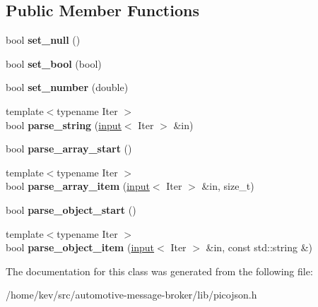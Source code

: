 \subsection*{Public Member Functions}
\begin{DoxyCompactItemize}
\item 
\hypertarget{classpicojson_1_1null__parse__context_ad142ddadd513e41324f8d0515a19df2c}{bool {\bfseries set\+\_\+null} ()}\label{classpicojson_1_1null__parse__context_ad142ddadd513e41324f8d0515a19df2c}

\item 
\hypertarget{classpicojson_1_1null__parse__context_aa77397f08cf7859fabc04e9e4460b93a}{bool {\bfseries set\+\_\+bool} (bool)}\label{classpicojson_1_1null__parse__context_aa77397f08cf7859fabc04e9e4460b93a}

\item 
\hypertarget{classpicojson_1_1null__parse__context_aeb8326108d42615b1b04cf82d510040c}{bool {\bfseries set\+\_\+number} (double)}\label{classpicojson_1_1null__parse__context_aeb8326108d42615b1b04cf82d510040c}

\item 
\hypertarget{classpicojson_1_1null__parse__context_aab2c7dee1eb5b477370832811cd40d14}{{\footnotesize template$<$typename Iter $>$ }\\bool {\bfseries parse\+\_\+string} (\hyperlink{classpicojson_1_1input}{input}$<$ Iter $>$ \&in)}\label{classpicojson_1_1null__parse__context_aab2c7dee1eb5b477370832811cd40d14}

\item 
\hypertarget{classpicojson_1_1null__parse__context_ae78f8991e157a85b7ce0fb36f9a5f628}{bool {\bfseries parse\+\_\+array\+\_\+start} ()}\label{classpicojson_1_1null__parse__context_ae78f8991e157a85b7ce0fb36f9a5f628}

\item 
\hypertarget{classpicojson_1_1null__parse__context_a6623f92117dd6dc7bca60e9e9463a1a0}{{\footnotesize template$<$typename Iter $>$ }\\bool {\bfseries parse\+\_\+array\+\_\+item} (\hyperlink{classpicojson_1_1input}{input}$<$ Iter $>$ \&in, size\+\_\+t)}\label{classpicojson_1_1null__parse__context_a6623f92117dd6dc7bca60e9e9463a1a0}

\item 
\hypertarget{classpicojson_1_1null__parse__context_a95c208456592c33d53548fa88b831c7c}{bool {\bfseries parse\+\_\+object\+\_\+start} ()}\label{classpicojson_1_1null__parse__context_a95c208456592c33d53548fa88b831c7c}

\item 
\hypertarget{classpicojson_1_1null__parse__context_a97c4b81a984ea473fe56e09aed7b9ca6}{{\footnotesize template$<$typename Iter $>$ }\\bool {\bfseries parse\+\_\+object\+\_\+item} (\hyperlink{classpicojson_1_1input}{input}$<$ Iter $>$ \&in, const std\+::string \&)}\label{classpicojson_1_1null__parse__context_a97c4b81a984ea473fe56e09aed7b9ca6}

\end{DoxyCompactItemize}


The documentation for this class was generated from the following file\+:\begin{DoxyCompactItemize}
\item 
/home/kev/src/automotive-\/message-\/broker/lib/picojson.\+h\end{DoxyCompactItemize}
